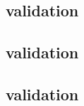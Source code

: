 \begin{sbmlenum}

\end{sbmlenum} \subsection*{ validation} \begin{sbmlenum}


\end{sbmlenum} \subsection*{ validation} \begin{sbmlenum}


\end{sbmlenum} \subsection*{ validation} \begin{sbmlenum}


\end{sbmlenum}
